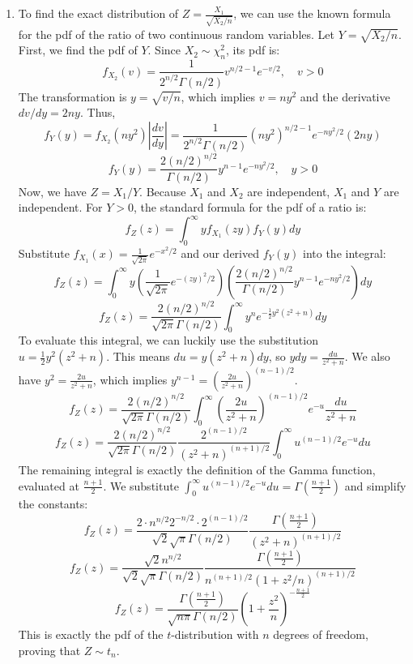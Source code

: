 \documentclass[12pt,a4paper]{article}\usepackage[]{graphicx}\usepackage[]{xcolor}
\begin{document}
\begin{enumerate}[label=\arabic*.]
    \item To find the exact distribution of $Z = \frac{X_1}{\sqrt{X_2/n}}$, we can use the known formula for the pdf of the ratio of two continuous random variables. Let $Y = \sqrt{X_2/n}$. First, we find the pdf of $Y$. Since $X_2 \sim \chi^2_n$, its pdf is:
    $$f_{X_2}(v) = \frac{1}{2^{n/2}\Gamma(n/2)} v^{n/2 - 1} e^{-v/2}, \quad v > 0$$
    The transformation is $y = \sqrt{v/n}$, which implies $v = ny^2$ and the derivative $dv/dy = 2ny$. Thus,
    $$f_Y(y) = f_{X_2}(ny^2) \left| \frac{dv}{dy} \right| = \frac{1}{2^{n/2}\Gamma(n/2)} (ny^2)^{n/2 - 1} e^{-ny^2/2} (2ny)$$
    $$f_Y(y) = \frac{2(n/2)^{n/2}}{\Gamma(n/2)} y^{n-1} e^{-ny^2/2}, \quad y > 0$$
    Now, we have $Z = X_1 / Y$. Because $X_1$ and $X_2$ are independent, $X_1$ and $Y$ are independent. For $Y > 0$, the standard formula for the pdf of a ratio is:
    $$f_Z(z) = \int_0^\infty y f_{X_1}(zy) f_Y(y) dy$$
    Substitute $f_{X_1}(x) = \frac{1}{\sqrt{2\pi}} e^{-x^2/2}$ and our derived $f_Y(y)$ into the integral:
    $$f_Z(z) = \int_0^\infty y \left( \frac{1}{\sqrt{2\pi}} e^{-(zy)^2/2} \right) \left( \frac{2(n/2)^{n/2}}{\Gamma(n/2)} y^{n-1} e^{-ny^2/2} \right) dy$$
    $$f_Z(z) = \frac{2(n/2)^{n/2}}{\sqrt{2\pi}\Gamma(n/2)} \int_0^\infty y^n e^{-\frac{1}{2}y^2(z^2 + n)} dy$$
    To evaluate this integral, we can luckily use the substitution $u = \frac{1}{2}y^2(z^2 + n)$. 
    This means $du = y(z^2 + n) dy$, so $y dy = \frac{du}{z^2 + n}$. 
    We also have $y^2 = \frac{2u}{z^2 + n}$, which implies $y^{n-1} = \left(\frac{2u}{z^2 + n}\right)^{(n-1)/2}$.
    $$f_Z(z) = \frac{2(n/2)^{n/2}}{\sqrt{2\pi}\Gamma(n/2)} \int_0^\infty \left(\frac{2u}{z^2 + n}\right)^{(n-1)/2} e^{-u} \frac{du}{z^2 + n}$$
    $$f_Z(z) = \frac{2(n/2)^{n/2}}{\sqrt{2\pi}\Gamma(n/2)} \frac{2^{(n-1)/2}}{(z^2 + n)^{(n+1)/2}} \int_0^\infty u^{(n-1)/2} e^{-u} du$$
    The remaining integral is exactly the definition of the Gamma function, evaluated at $\frac{n+1}{2}$. We substitute $\int_0^\infty u^{(n-1)/2} e^{-u} du = \Gamma\left(\frac{n+1}{2}\right)$ and simplify the constants:
    $$f_Z(z) = \frac{2 \cdot n^{n/2} 2^{-n/2} \cdot 2^{(n-1)/2}}{\sqrt{2}\sqrt{\pi}\Gamma(n/2)} \frac{\Gamma\left(\frac{n+1}{2}\right)}{(z^2 + n)^{(n+1)/2}}$$
    $$f_Z(z) = \frac{\sqrt{2} n^{n/2}}{\sqrt{2}\sqrt{\pi}\Gamma(n/2)} \frac{\Gamma\left(\frac{n+1}{2}\right)}{n^{(n+1)/2} (1 + z^2/n)^{(n+1)/2}}$$
    $$f_Z(z) = \frac{\Gamma\left(\frac{n+1}{2}\right)}{\sqrt{n\pi}\Gamma(n/2)} \left(1 + \frac{z^2}{n}\right)^{-\frac{n+1}{2}}$$
    This is exactly the pdf of the $t$-distribution with $n$ degrees of freedom, proving that $Z \sim t_n$.


\end{enumerate}
\end{document}
